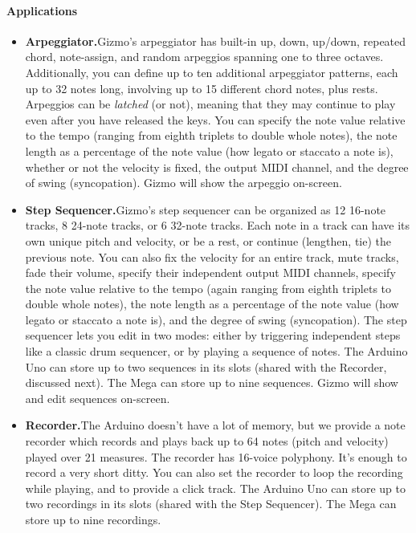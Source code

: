 \documentclass{article}
\begin{document}
\paragraph{Applications}
\begin{itemize}
\item {\bf Arpeggiator.}\quad Gizmo's arpeggiator has built-in up, down, up/down, repeated chord, note-assign, and random arpeggios spanning one to three octaves.  Additionally, you can define up to ten additional arpeggiator patterns, each up to 32 notes long, involving up to 15 different chord notes, plus rests.  Arpeggios can be {\it latched} (or not), meaning that they may continue to play even after you have released the keys.  You can specify  the note value relative to the tempo (ranging from eighth triplets to double whole notes), the note length as a percentage of the note value (how legato or staccato a note is), whether or not the velocity is fixed, the output MIDI channel, and the degree of swing (syncopation).  Gizmo will show the arpeggio on-screen.
\item {\bf Step Sequencer.}\quad Gizmo's step sequencer can be organized as 12 16-note tracks, 8 24-note tracks, or 6 32-note tracks.  Each note in a track can have its own unique pitch and velocity, or be a rest, or continue (lengthen, tie) the previous note.  You can also fix the velocity for an entire track, mute tracks, fade their volume, specify their independent output MIDI channels, specify the note value relative to the tempo (again ranging from eighth triplets to double whole notes), the note length as a percentage of the note value (how legato or staccato a note is), and the degree of swing (syncopation).    The step sequencer lets you edit in two modes: either by triggering independent steps like a classic drum sequencer, or by playing a sequence of notes.  The Arduino Uno can store up to two sequences in its slots (shared with the Recorder, discussed next).  The Mega can store up to nine sequences.  Gizmo will show and edit sequences on-screen.
\item {\bf Recorder.}\quad The Arduino doesn't have a lot of memory, but we provide a note recorder which records and plays back up to 64 notes (pitch and velocity) played over 21 measures. The recorder has 16-voice polyphony.   It's enough to record a very short ditty.  You can also set the recorder to loop the recording while playing, and to provide a click track.  The Arduino Uno can store up to two recordings in its slots (shared with the Step Sequencer).  The Mega can store up to nine recordings.

\end{itemize}
\end{document}
